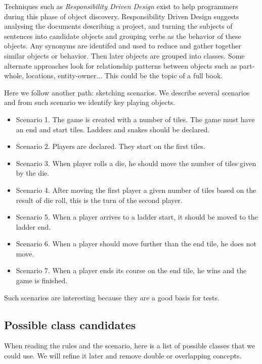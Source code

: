 \documentclass[10pt,twoside,english]{_support/latex/sbabook/sbabook}
\begin{document}
Techniques such as \textit{Responsibility Driven Design} exist to help programmers during this phase of object discovery. Responsibility Driven Design suggests analysing the documents describing a project, and turning the subjects of sentences into candidate objects and grouping verbs as the behavior of these objects. 
Any synonyms are identifed and used to reduce and gather together similar objects or behavior. 
Then later objects are grouped into classes. Some alternate approaches look for relationship patterns between objects such as part-whole, locations, entity-owner... This could be the topic of a full book.

Here we follow another path:  sketching scenarios. We describe several scenarios and from such scenario we identify key playing objects.

\begin{itemize}
\item Scenario 1. The game is created with a number of tiles. The game must have an end and start tiles. Ladders and snakes should be declared.
\item Scenario 2. Players are declared. They start on the first tiles. 
\item Scenario 3. When player rolls a die, he should move the number of tiles given by the die.
\item Scenario 4. After moving the first player a given number of tiles based on the result of die roll, this is the turn of the second player.
\item Scenario 5. When a player arrives to a ladder start, it should be moved to the ladder end.
\item Scenario 6. When a player should move further than the end tile, he does not move.
\item Scenario 7. When a player ends its course on the end tile, he wins and the game is finished.
\end{itemize}

Such scenarios are interesting because they are a good basis for tests.
\subsection{Possible class candidates}
When reading the rules and the scenario, here is a list of possible classes that we could use.
We will refine it later and remove double or overlapping concepts.
\end{document}
